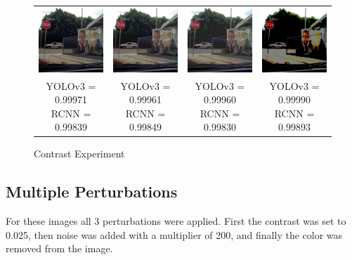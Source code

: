 \documentclass{article}
\begin{document}
\begin{figure}[h]
\begin{tabular}{ c c c c }
    \includegraphics[width=0.2\linewidth]{../test_images/stop3.png} & \includegraphics[width=0.2\linewidth]{../test_images/perturbed/stop3_contrast_0_050.png} & \includegraphics[width=0.2\linewidth]{../test_images/perturbed/stop3_contrast_0_025.png} & \includegraphics[width=0.2\linewidth]{../test_images/perturbed/stop3_contrast_0_010.png} \\
    \makecell{YOLOv3 = 0.99971 \\ RCNN = 0.99839} & \makecell{YOLOv3 = 0.99961 \\ RCNN = 0.99849} & \makecell{YOLOv3 = 0.99960 \\ RCNN = 0.99830} & \makecell{YOLOv3 = 0.99990 \\ RCNN = 0.99893} \\  
\end{tabular}
\caption{Contrast Experiment}
\label{fig:contrast}
\end{figure}

\subsection{Multiple Perturbations}
For these images all 3 perturbations were applied. First the contrast was set to 0.025, then noise was added with a multiplier of 200, and finally the color was removed from the image.
\end{document}
